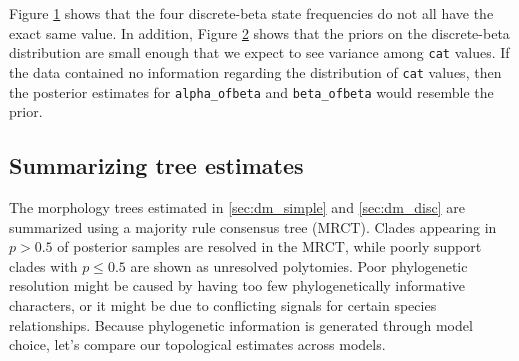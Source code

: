\begin{figure}[h!]
\label{fig:tracer_cats}
\end{figure}

\begin{figure}[h!]
\label{fig:tracer_alpha_beta}
\end{figure}

Figure \ref{fig:tracer_cats} shows that the four discrete-beta state frequencies do not all have the exact same value.
In addition, Figure \ref{fig:tracer_alpha_beta} shows that the priors on the discrete-beta distribution are small enough that we expect to see variance among {\tt cat} values.
If the data contained no information regarding the distribution of {\tt cat} values, then the posterior estimates for {\tt alpha\_ofbeta} and {\tt beta\_ofbeta} would resemble the prior.

\subsection{Summarizing tree estimates}


The morphology trees estimated in \ref{sec:dm_simple} and \ref{sec:dm_disc} are summarized using a majority rule consensus tree (MRCT).
Clades appearing in $p>0.5$ of posterior samples are resolved in the MRCT, while poorly support clades with $p \leq 0.5$ are shown as unresolved polytomies.
Poor phylogenetic resolution might be caused by having too few phylogenetically informative characters, or it might be due to conflicting signals for certain species relationships.
Because phylogenetic information is generated through model choice, let's compare our topological estimates across models.

